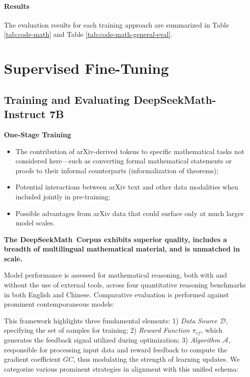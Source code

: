\paragraph{Results}
The evaluation results for each training approach are summarized in Table \ref{tab:code-math} and Table \ref{tab:code-math-general-eval}.

\section{Supervised Fine-Tuning}

\subsection{Training and Evaluating DeepSeekMath-Instruct 7B}

\textbf{One-Stage Training}

\begin{itemize}[topsep=0pt]
    \item The contribution of arXiv-derived tokens to specific mathematical tasks not considered here—such as converting formal mathematical statements or proofs to their informal counterparts (informalization of theorems);
    \item Potential interactions between arXiv text and other data modalities when included jointly in pre-training;
    \item Possible advantages from arXiv data that could surface only at much larger model scales.
\end{itemize}

\textbf{The DeepSeekMath~Corpus exhibits superior quality, includes a breadth of multilingual mathematical material, and is unmatched in scale.}

Model performance is assessed for mathematical reasoning, both with and without the use of external tools, across four quantitative reasoning benchmarks in both English and Chinese. Comparative evaluation is performed against prominent contemporaneous models:

This framework highlights three fundamental elements: 1) \textit{Data Source $\mathcal{D}$}, specifying the set of samples for training; 2) \textit{Reward Function $\pi_{{rf}}$}, which generates the feedback signal utilized during optimization; 3) \textit{Algorithm $\mathcal{A}$}, responsible for processing input data and reward feedback to compute the gradient coefficient $GC$, thus modulating the strength of learning updates. We categorize various prominent strategies in alignment with this unified schema:

